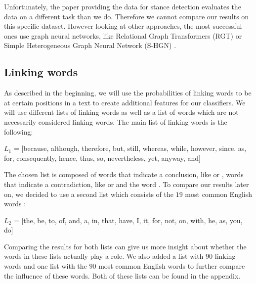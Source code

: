 Unfortunately, the paper providing the data for stance detection \cite{ibm} evaluates the data on a different task than we do. Therefore we cannot compare our results on this specific dataset. However looking at other approaches, the most successful ones use graph neural networks, like Relational Graph Transformers (RGT) \cite{rgt} or Simple Heterogeneous Graph Neural Network (S-HGN) \cite{shgn}.

\subsection{Linking words}
As described in the beginning, we will use the probabilities of linking words to be at certain positions in a text to create additional features for our classifiers. We will use different lists of linking words as well as a list of words which are not necessarily considered linking words. The main list of linking words is the following:

\begin{center}
	$L_1$ = [because, although, therefore, but, still, whereas, while, however, since, as, for, consequently, hence, thus, so, nevertheless, yet, anyway, and]
\end{center}

The chosen list is composed of words that indicate a conclusion, like  or , words that indicate a contradiction, like  or  and the word . To compare our results later on, we decided to use a second list which consists of the $19$ most common English words \cite{mostcommon}:
\begin{center}
	$L_2$ = [the, be, to, of, and, a, in, that, have, I, it, for, not, on, with, he, as, you, do]
\end{center}
Comparing the results for both lists can give us more insight about whether the words in these lists actually play a role. We also added a list with $90$ linking words and one list with the $90$ most common English words to further compare the influence of these words. Both of these lists can be found in the appendix.

